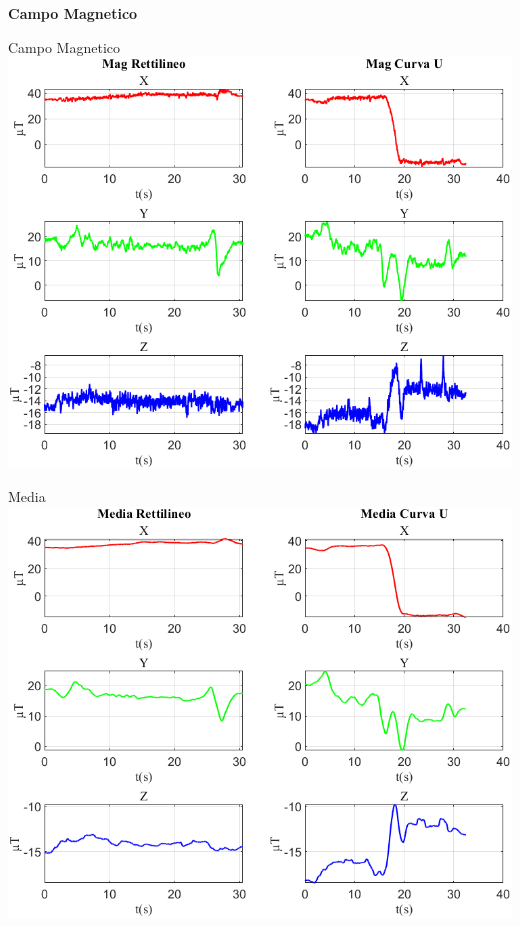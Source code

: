\documentclass[beamer]{standalone}
\begin{document}
	\begin{frame}
		\color{blue}\centering\Huge{\textbf{Campo Magnetico}}	
	\end{frame}
	
	\begin{frame}{{Campo Magnetico}}
		\centering\includegraphics[height=.8\textheight]{figure/Mag/Mag}
	\end{frame}
	
	
	\begin{frame}{{Media}}
		\centering\includegraphics[height=.8\textheight]{figure/Mag/Media}
	\end{frame}
		
\end{document}
